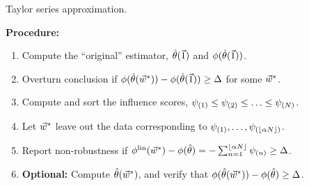 

\begin{frame}{Taylor series approximation.}

\textbf{Procedure:}

\begin{enumerate}
    \item<2-> Compute the ``original'' estimator, $\hat{\theta}(\vec{1})$ and
    $\phi(\hat{\theta}(\vec{1}))$.
    \item<3-> Overturn conclusion if
        $\phi(\hat{\theta}(\vec{w}^*)) - \phi(\hat{\theta}(\vec{1})) \ge \Delta$
        for some $\vec{w}^*$.
    \item<4-> Compute and sort the influence scores,
        $\psi_{(1)} \le \psi_{(2)} \le \ldots \le \psi_{(N)}$.
    \item<5-> Let $\vec{w}^*$ leave out the data corresponding to
    $\psi_{(1)},  \ldots , \psi_{(\lfloor \alpha N \rfloor)}$.
    \item<6-> Report non-robustness if
        $ \phi^{\mathrm{lin}}(\vec{w}^*) - \phi(\hat{\theta})  =
            - \sum_{n=1}^{\lfloor \alpha N \rfloor} \psi_{(n)} \ge \Delta$.
    \item<7-> \textbf{Optional: } Compute $\hat{\theta}(\vec{w}^*)$, and verify
    that $\phi(\hat{\theta}(\vec{w}^*)) - \phi(\hat{\theta}) \ge \Delta$.
\end{enumerate}


%
%


\end{frame}


